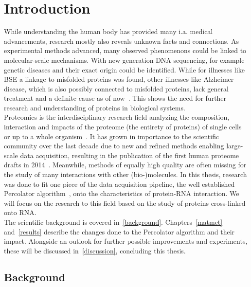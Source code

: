 
\chapter{Introduction}
\label{introduction}
While understanding the human body has provided many i.a. medical advancements, research mostly also reveals unknown facts and connections. As experimental methods advanced, many observed phenomenons could be linked to molecular-scale mechanisms. With new generation DNA sequencing, for example genetic diseases and their exact origin could be identified. While for illnesses like BSE a linkage to misfolded proteins was found, other illnesses like Alzheimer disease, which is also possibly connected to misfolded proteins, lack general treatment and a definite cause as of now~\cite{Burns2009}. This shows the need for further research and understanding of proteins in biological systems.\\
Proteomics is the interdisciplinary research field analyzing the composition, interaction and impacts of the proteome (the entirety of proteins) of single cells or up to a whole organism~\cite{Han2008, Sachsenberg2017}. It has grown in importance to the scientific community over the last decade due to new and refined methods enabling large-scale data acquisition, resulting in the publication of the first human proteome drafts in 2014~\cite{Wilhelm2014, Kim2014}. Meanwhile, methods of equally high quality are often missing for the study of many interactions with other (bio-)molecules. In this thesis, research was done to fit one piece of the data acquisition pipeline, the well established Percolator algorithm~\cite{Granholm2012}, onto the characteristics of protein-RNA interaction. We will focus on the research to this field based on the study of proteins cross-linked onto RNA.\\
The scientific background is covered in~\autoref{background}. Chapters~\ref{matmet} and~\ref{results} describe the changes done to the Percolator algorithm and their impact. Alongside an outlook for further possible improvements and experiments, these will be discussed in~\autoref{discussion}, concluding this thesis.

\section{Background}
\label{background}
